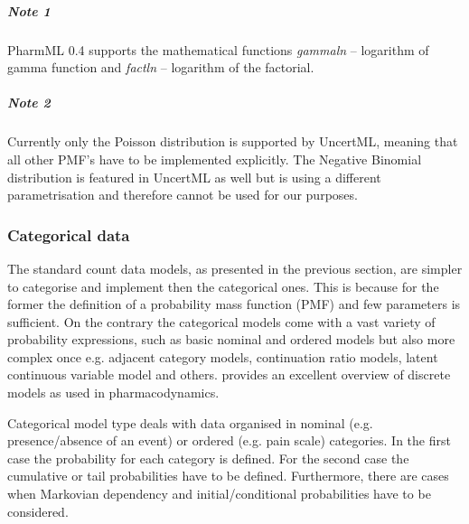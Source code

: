 \subparagraph{Note 1} PharmML 0.4 supports the mathematical functions \textit{gammaln} 
-- logarithm of gamma function and \textit{factln} -- logarithm of the factorial.
\subparagraph{Note 2} Currently only the Poisson distribution is supported by UncertML, 
meaning that all other PMF's have to be implemented explicitly. The Negative Binomial distribution
is featured in UncertML as well but is using a different parametrisation and therefore cannot be used 
for our purposes.

\subsubsection{Categorical data}
\label{subsec:mmCategoricalData}
The standard count data models, as presented in the previous section, are simpler to categorise 
and implement then the categorical ones. This is because for the former the definition of a probability 
mass function (PMF) and few parameters is sufficient. On the contrary the categorical models come 
with a vast variety of probability expressions, such as basic nominal and ordered models but also 
more complex once e.g. adjacent category models, continuation ratio 
models, latent continuous variable model and others. \cite{Paule:2012fk} provides an excellent 
overview of discrete models as used in pharmacodynamics.

Categorical model type deals with data organised in nominal (e.g. presence/absence of an event) 
or ordered (e.g. pain scale) categories. In the first case the probability for each category is defined. 
For the second case the cumulative or tail probabilities have to be defined. Furthermore, there are cases
when Markovian dependency and initial/conditional probabilities have to be considered.

